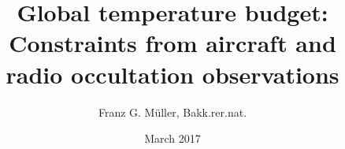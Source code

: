 \begin{CommandLineListing}[style=DefaultFileListing, print=true, basicstyle={\ttfamily\small}, %
                           basewidth=0.47em, xleftmargin=0pt, gobble=3, %
                           caption={Example of a \ac{msc} or \ac{phd} thesis cover page}, %
                           label=lst:coverPageMasterOrPhdThesis]
   \renewcommand*{\titlepagestyle}{%
     empty%
   }
   \renewcommand*{\extratitlepagestyle}{%
     empty%
   }
   \subject{%
      \LARGE{Master Thesis} \vspace{2.5mm} \\
      \Large{to obtain the degree Master of Science} \vspace{2.5mm} \\
      \Large{at the Faculty of Natural Sciences} \\
      \Large{University of Graz}%
   }
   \title{%
     \Huge{Global temperature budget: \\
           Constraints from aircraft and \\
           radio occultation observations}%
   }
   \subtitle{%
   }
   \author{%
     \Large{Franz G. M\"uller, Bakk.rer.nat.}%
   }
   \date{%
     \large{March 2017}%
     \vspace{5mm}%
   }
   \publishers{%
      \large{%
      Supervisor: Univ.-Prof.\! Mag.\! Dr.rer.nat.\! Erika L. Mauerheimer%
      \vspace{1.5mm} \\
      Co{\hyphen}Supervisor: Mag.\! Dr.rer.nat.\! Detlef R\"ottbauer}%
      \vspace{7.0mm} \\
      \normalsize{%
      Wegener Center for Climate and Global Change (WEGC) and \\
      Institute for Geophysics, Astrophysics, and
      Meteorology \textfractionsolidus{} Institute of Physics \\
      University of Graz}%
      \vspace{5mm} \\
      \texttt{[image: logo\_unigraz\_wegc\_medium.png]}
}
\end{CommandLineListing}
